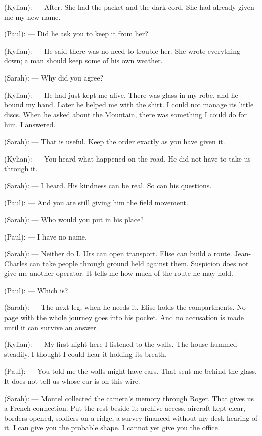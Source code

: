 \begin{room}
(Kylian): --- After. She had the packet and the dark cord. She had already given me my new name.

(Paul): --- Did he ask you to keep it from her?

(Kylian): --- He said there was no need to trouble her. She wrote everything down; a man should keep some of his own weather.

(Sarah): --- Why did you agree?

(Kylian): --- He had just kept me alive. There was glass in my robe, and he bound my hand. Later he helped me with the shirt. I could not manage its little discs. When he asked about the Mountain, there was something I could do for him. I answered.

(Sarah): --- That is useful. Keep the order exactly as you have given it.

(Kylian): --- You heard what happened on the road. He did not have to take us through it.

(Sarah): --- I heard. His kindness can be real. So can his questions.

(Paul): --- And you are still giving him the field movement.

(Sarah): --- Who would you put in his place?

(Paul): --- I have no name.

(Sarah): --- Neither do I. Urs can open transport. Elise can build a route. Jean-Charles can take people through ground held against them. Suspicion does not give me another operator. It tells me how much of the route he may hold.

(Paul): --- Which is?

(Sarah): --- The next leg, when he needs it. Elise holds the compartments. No page with the whole journey goes into his pocket. And no accusation is made until it can survive an answer.

(Kylian): --- My first night here I listened to the walls. The house hummed steadily. I thought I could hear it holding its breath.

(Paul): --- You told me the walls might have ears. That sent me behind the glass. It does not tell us whose ear is on this wire.

(Sarah): --- Montel collected the camera's memory through Roger. That gives us a French connection. Put the rest beside it: archive access, aircraft kept clear, borders opened, soldiers on a ridge, a survey financed without my desk hearing of it. I can give you the probable shape. I cannot yet give you the office.


\end{room}
